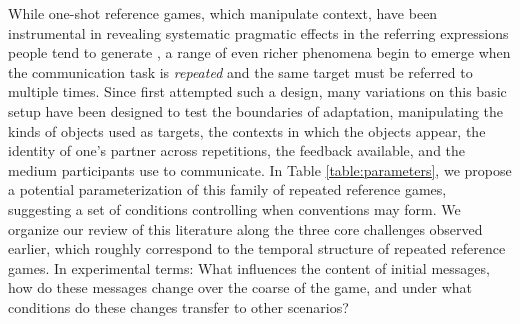 \documentclass[11pt, floatsintext, jou]{apa6}
\begin{document}

While one-shot reference games, which manipulate context, have been instrumental in revealing systematic pragmatic effects in the referring expressions people tend to generate \cite{KraussWeinheimer67_ReferentSimilarity,KoolenGattGoudbeekKrahmer11_Overspecification,GrafEtAl16_BasicLevel,VanDeemter16_ComputationalModelsOfReferring}, a range of even richer phenomena begin to emerge when the communication task is \emph{repeated} and the same target must be referred to multiple times. Since  first attempted such a design, many variations on this basic setup have been designed to test the boundaries of adaptation, manipulating the kinds of objects used as targets, the contexts in which the objects appear, the identity of one's partner across repetitions, the feedback available, and the medium participants use to communicate. In Table \ref{table:parameters}, we propose a potential parameterization of this family of repeated reference games, suggesting a set of conditions controlling when conventions may form. We organize our review of this literature along the three core challenges observed earlier, which roughly correspond to the temporal structure of repeated reference games. In experimental terms: What influences the content of initial messages, how do these messages change over the coarse of the game, and under what conditions do these changes transfer to other scenarios?   %
\end{document}
